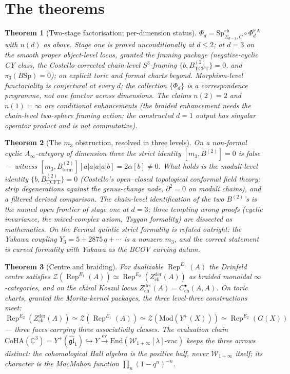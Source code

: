 \documentclass[11pt]{article}
\providecommand{\cW}{\mathcal{W}}
\providecommand{\cZ}{\mathcal{Z}}
\providecommand{\bC}{\mathbb{C}}
\providecommand{\fgl}{\mathfrak{gl}}
\providecommand{\Zder}{Z^{\mathrm{der}}_{\mathrm{ch}}}
\providecommand{\PhiFA}{\Phi^{\mathrm{FA}}}
\providecommand{\SpCh}{\mathrm{Sp}^{\mathrm{ch}}}
\providecommand{\CoHA}{\mathrm{CoHA}}
\providecommand{\Rep}{\operatorname{Rep}}
\newtheorem{theorem}{Theorem}[section]
\begin{document}
\section{The theorems}\label{sec:theorems}

\begin{theorem}[Two-stage factorisation; per-dimension status]
\label{thm:twostage}
$\Phi_d=\SpCh_{\Sigma_{d-1},C}\circ\PhiFA_d$ with $n(d)$ as above.
Stage one is proved unconditionally at $d\le2$; at $d=3$ on the smooth
proper object-level locus, granted the framing package
\textup{(negative-cyclic CY class, the Costello-corrected chain-level
$S^3$-framing $\{b,B^{(2)}_{\mathrm{TCFT}}\}=0$, and
$\pi_3(B\mathrm{Sp})=0$)}; on explicit toric and formal charts beyond.
Morphism-level functoriality is conjectural at every $d$; the
collection $\{\Phi_d\}$ is a correspondence programme, not one functor
across dimensions. The claims $n(2)=2$ and $n(1)=\infty$ are
conditional enhancements \textup{(the braided enhancement needs the
chain-level two-sphere framing action; the constructed $d=1$ output
has singular operator product and is not commutative)}.
\end{theorem}

\begin{theorem}[The $m_3$ obstruction, resolved in three levels]
\label{thm:m3}
On a non-formal cyclic $A_\infty$-category of dimension three the
strict identity $[m_3,B^{(2)}]=0$ is \emph{false} --- witness
$[m_3,B^{(2)}_{\mathrm{term}}][a|a|a|a|b]=2\alpha[b]\neq0$. What holds
is the moduli-level identity $\{b,B^{(2)}_{\mathrm{TCFT}}\}=0$
\textup{(Costello's open--closed topological conformal field theory:
strip degenerations against the genus-change node, $\partial^2=0$ on
moduli chains)}, and a filtered derived comparison. The chain-level
identification of the two $B^{(2)}$'s is the named open frontier of
stage one at $d=3$; three tempting wrong proofs \textup{(cyclic
invariance, the mixed-complex axiom, Tsygan formality)} are dissected
as mathematics. On the Fermat quintic strict formality is refuted
outright: the Yukawa coupling $Y_3=5+2875\,q+\cdots$ is a nonzero
$m_3$, and the correct statement is \emph{curved} formality with
Yukawa as the BCOV curving datum.
\end{theorem}

\begin{theorem}[Centre and braiding]\label{thm:centre}
For dualizable $\Rep^{E_1}(A)$ the Drinfeld centre satisfies
$\cZ(\Rep^{E_1}(A))\simeq\Rep^{E_2}(\Zder(A))$ as braided monoidal
$\infty$-categories, and on the chiral Koszul locus
$\Zder(A)=C^\bullet_{\mathrm{ch}}(A,A)$. On toric charts, granted the
Morita-kernel packages, the three level-three constructions meet:
$\Rep^{E_2}(\Zder(A))\simeq\cZ(\Rep^{E_1}(A))
\simeq\cZ(\mathrm{Mod}(Y^+(X)))\simeq\Rep^{E_2}(G(X))$
--- three faces carrying three associativity classes. The evaluation
chain
$\CoHA(\bC^3)=Y^+(\widehat{\fgl}_1)\hookrightarrow
Y\xrightarrow{\mathrm{ev}}\mathrm{End}
(\cW_{1+\infty}[\lambda]\text{-vac})$
keeps the three arrows distinct: the cohomological Hall algebra is the
positive half, never $\cW_{1+\infty}$ itself; its character is the
MacMahon function $\prod_n(1-q^n)^{-n}$.
\end{theorem}
\end{document}
